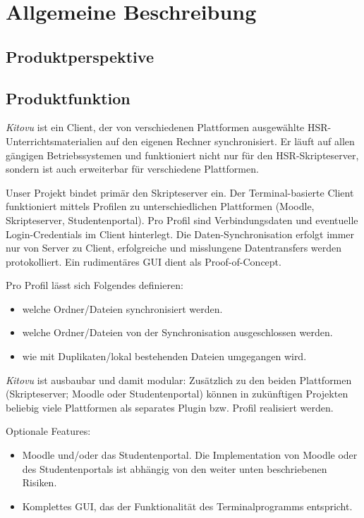 \documentclass[a4paper]{article}
\let\oldsection\section
\renewcommand\section{\clearpage\oldsection}
\begin{document}
\pagebreak
\section{Allgemeine Beschreibung}

\subsection{Produktperspektive}

\subsection{Produktfunktion}
\emph{Kitovu} ist ein Client, der von verschiedenen Plattformen ausgewählte HSR-Unterrichtsmaterialien auf den eigenen Rechner synchronisiert. Er läuft auf allen gängigen Betriebssystemen und funktioniert nicht nur für den HSR-Skripteserver, sondern ist auch erweiterbar für verschiedene Plattformen.

Unser Projekt bindet primär den Skripteserver ein. Der Terminal-basierte Client funktioniert mittels Profilen zu unterschiedlichen Plattformen (Moodle, Skripteserver, Studentenportal). Pro Profil sind Verbindungsdaten und eventuelle Login-Credentials im Client hinterlegt. Die Daten-Synchronisation erfolgt immer nur von Server zu Client, erfolgreiche und misslungene Datentransfers werden protokolliert. Ein rudimentäres GUI dient als Proof-of-Concept.

Pro Profil lässt sich Folgendes definieren:

\begin{itemize}
	\item welche Ordner/Dateien synchronisiert werden.
	\item welche Ordner/Dateien von der Synchronisation ausgeschlossen werden.
	\item wie mit Duplikaten/lokal bestehenden Dateien umgegangen wird.
\end{itemize}

\emph{Kitovu} ist ausbaubar und damit modular: Zusätzlich zu den beiden Plattformen (Skripteserver; Moodle oder Studentenportal) können in zukünftigen Projekten beliebig viele Plattformen als separates Plugin bzw. Profil realisiert werden.

Optionale Features:

\begin{itemize}
	\item Moodle und/oder das Studentenportal. Die Implementation von Moodle oder des Studentenportals ist abhängig von den weiter unten beschriebenen Risiken.
	\item Komplettes GUI, das der Funktionalität des Terminalprogramms entspricht.
\end{itemize}
\end{document}

